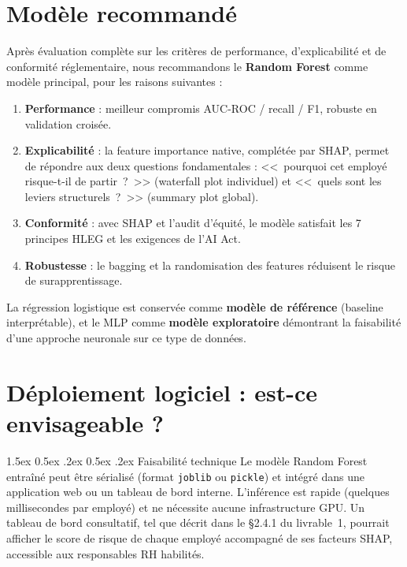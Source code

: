 \documentclass[12pt,a4paper]{article}
\makeatletter
\renewcommand\paragraph{\@startsection{paragraph}{4}{\z@}%
  {1.5ex \@plus 0.5ex \@minus .2ex}%
  {0.5ex \@plus .2ex}%
  {\normalfont\normalsize\bfseries}}
\makeatother
\begin{document}
\section{Modèle recommandé}

Après évaluation complète sur les critères de performance, d'explicabilité et de conformité réglementaire, nous recommandons le \textbf{Random Forest} comme modèle principal, pour les raisons suivantes :

\begin{enumerate}
    \item \textbf{Performance} : meilleur compromis AUC-ROC / recall / F1, robuste en validation croisée.
    \item \textbf{Explicabilité} : la feature importance native, complétée par SHAP, permet de répondre aux deux questions fondamentales : <<~pourquoi cet employé risque-t-il de partir~?~>> (waterfall plot individuel) et <<~quels sont les leviers structurels~?~>> (summary plot global).
    \item \textbf{Conformité} : avec SHAP et l'audit d'équité, le modèle satisfait les 7 principes HLEG et les exigences de l'AI Act.
    \item \textbf{Robustesse} : le bagging et la randomisation des features réduisent le risque de surapprentissage.
\end{enumerate}

La régression logistique est conservée comme \textbf{modèle de référence} (baseline interprétable), et le MLP comme \textbf{modèle exploratoire} démontrant la faisabilité d'une approche neuronale sur ce type de données.

\section{Déploiement logiciel : est-ce envisageable ?}

\paragraph{Faisabilité technique} Le modèle Random Forest entraîné peut être sérialisé (format \texttt{joblib} ou \texttt{pickle}) et intégré dans une application web ou un tableau de bord interne. L'inférence est rapide (quelques millisecondes par employé) et ne nécessite aucune infrastructure GPU. Un tableau de bord consultatif, tel que décrit dans le §2.4.1 du livrable~1, pourrait afficher le score de risque de chaque employé accompagné de ses facteurs SHAP, accessible aux responsables RH habilités.
\end{document}
